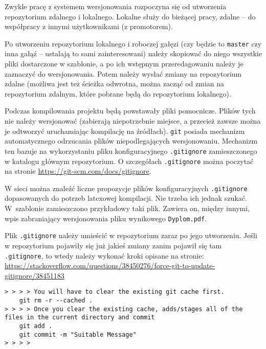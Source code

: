 Zwykle pracę z systemem wersjonowania rozpoczyna się od utworzenia repozytorium zdalnego i lokalnego. Lokalne służy do bieżącej pracy, zdalne -- do współpracy z innymi użytkownikami (z promotorem). 

Po utworzeniu repozytorium lokalnego i roboczej gałęzi (czy będzie to \texttt{master} czy inna gałąź -- ustalają to sami zainteresowani) należy skopiować do niego wszystkie pliki dostarczone w szablonie, a po ich wstępnym przeredagowaniu należy je zaznaczyć do wersjonowania. Potem należy wysłać zmiany na repozytorium zdalne (możliwa jest też ścieżka odwrotna, można zacząć od zmian na repozytorium zdalnym, które pobrane będą do repozytorium lokalnego).

Podczas kompilowania projektu będą powstawały pliki pomocnicze. Plików tych nie należy wersjonować (zabierają niepotrzebnie miejsce, a przecież zawsze można je odtworzyć uruchamiając kompilację na źródłach). \texttt{git} posiada mechanizm automatycznego odrzucania plików niepodlegających wersjonowaniu. Mechanizm ten bazuje na wykorzystaniu pliku konfiguracyjnego \texttt{.gitignore} zamieszczonego w katalogu głównym repozytorium. O szczegółach \texttt{.gitignore} można poczytać  na stronie \url{https://git-scm.com/docs/gitignore}. 

W sieci można znaleźć liczne propozycje plików konfiguracyjnych \texttt{.gitignore} dopasowanych do potrzeb latexowej kompilacji. Nie trzeba ich jednak szukać. W~szablonie zamieszczono przykładowy taki plik. Zawiera on, między innymi, wpis zabraniający wersjonowania pliku wynikowego \texttt{Dyplom.pdf}. 


Plik \texttt{.gitignore} należy umieścić w repozytorium zaraz po jego utworzeniu. Jeśli w repozytorium pojawiły się już jakieś zmiany zanim pojawił się tam \texttt{.gitignore}, to wtedy należy wykonać kroki opisane na stronie: \url{https://stackoverflow.com/questions/38450276/force-git-to-update-gitignore/38451183}

\begin{lstlisting}[basicstyle=\small\ttfamily]
> > > > You will have to clear the existing git cache first.
    git rm -r --cached .
> > > > Once you clear the existing cache, adds/stages all of the files in the current directory and commit
    git add .
    git commit -m "Suitable Message"
> > > > 
\end{lstlisting}



